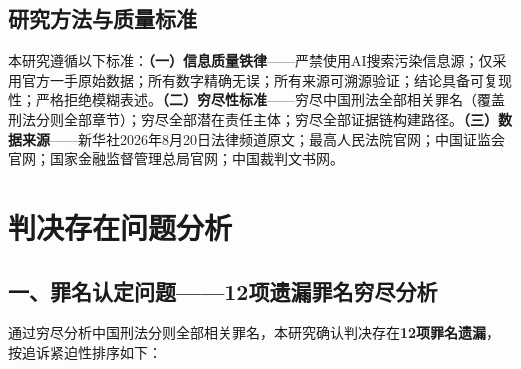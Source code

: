 \documentclass[11pt,a4paper,oneside,openany]{article}
\begin{document}
\subsection{研究方法与质量标准}
本研究遵循以下标准：\textbf{（一）信息质量铁律}——严禁使用AI搜索污染信息源；仅采用官方一手原始数据；所有数字精确无误；所有来源可溯源验证；结论具备可复现性；严格拒绝模糊表述。\textbf{（二）穷尽性标准}——穷尽中国刑法全部相关罪名（覆盖刑法分则全部章节）；穷尽全部潜在责任主体；穷尽全部证据链构建路径。\textbf{（三）数据来源}——新华社2026年8月20日法律频道原文；最高人民法院官网；中国证监会官网；国家金融监督管理总局官网；中国裁判文书网。

\section{判决存在问题分析}

\subsection{一、罪名认定问题——12项遗漏罪名穷尽分析}
通过穷尽分析中国刑法分则全部相关罪名，本研究确认判决存在\textbf{12项罪名遗漏}，按追诉紧迫性排序如下：
\end{document}

